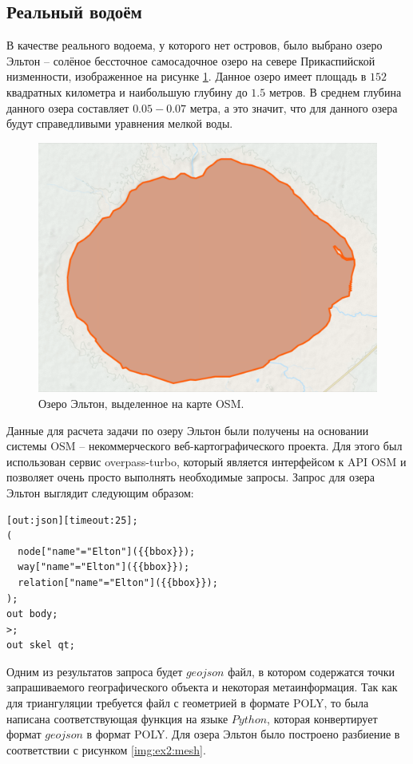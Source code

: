 \documentclass[14pt]{extreport}
\begin{document}
\subsection{Реальный водоём}


В качестве реального водоема, у которого нет островов, было выбрано озеро Эльтон -- солёное бессточное самосадочное озеро на севере Прикаспийской низменности, изображенное на рисунке \ref{img:lake:elton}. Данное озеро имеет площадь в $152$ квадратных километра и наибольшую глубину до $1.5$ метров. В среднем глубина данного озера составляет $0.05 - 0.07$ метра, а это значит, что для данного озера будут справедливыми уравнения мелкой воды.

\begin{figure}[H]
\centerline{
\includegraphics[width=0.6\linewidth]{images/ex2/lake_elton}}
\caption{Озеро Эльтон, выделенное на карте OSM.}
\label{img:lake:elton}
\end{figure}

Данные для расчета задачи по озеру Эльтон были получены на основании системы OSM\cite{bib:website:osm} -- некоммерческого веб-картографического проекта. Для этого был использован сервис overpass-turbo\cite{bib:website:overpassturbo}, который является интерфейсом к API OSM и позволяет очень просто выполнять необходимые запросы. Запрос для озера Эльтон выглядит следующим образом:

\begin{lstlisting}[frame=single]
[out:json][timeout:25];
(
  node["name"="Elton"]({{bbox}});
  way["name"="Elton"]({{bbox}});
  relation["name"="Elton"]({{bbox}});
);
out body;
>;
out skel qt;	
\end{lstlisting}

Одним из результатов запроса будет $geojson$ файл, в котором содержатся точки запрашиваемого географического объекта и некоторая метаинформация. Так как для триангуляции требуется файл с геометрией в формате POLY, то была написана соответствующая функция на языке $Python$, которая конвертирует формат $geojson$ в формат POLY. Для озера Эльтон было построено разбиение в соответствии с рисунком \ref{img:ex2:mesh}.
\end{document}
